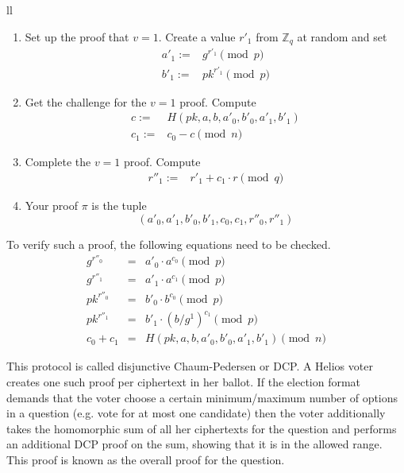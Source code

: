 \documentclass{llncs}
\begin{document}
\begin{center}
\begin{tabular}{ll}
\begin{minipage}{0.45\textwidth}
\begin{enumerate}
\item Set up the proof that $v = 1$.
Create a value $r'_1$ from $\mathbb Z_q$ at random and set
\[ \begin{array}{rl}
a'_1 := & g^{r'_1} \pmod{p} \\
b'_1 := & pk^{r'_1} \pmod{p}
\end{array} \]

\item Get the challenge for the $v = 1$ proof.
Compute
\[ \begin{array}{rl}
c := & H(pk, a, b, a'_0, b'_0, a'_1, b'_1) \\
c_1 := & c_0 - c \pmod{n}
\end{array} \]

\item Complete the $v = 1$ proof.
Compute
\[ \begin{array}{rl}
r''_1 := & r'_1 + c_1 \cdot r \pmod{q}
\end{array} \]

\item Your proof $\pi$ is the tuple
\[
(a'_0, a'_1, b'_0, b'_1, c_0, c_1, r''_0, r''_1)
\]
\end{enumerate}
\end{minipage}
\end{tabular}
\end{center}

To verify such a proof, the following equations need to be checked.
\begin{eqnarray}
g^{r''_0} & = & a'_0 \cdot a^{c_0} \pmod{p} \\
g^{r''_1} & = & a'_1 \cdot a^{c_1} \pmod{p} \\
pk^{r''_0} & = & b'_0 \cdot b^{c_0} \pmod{p} \\
pk^{r''_1} & = & b'_1 \cdot (b/g^1)^{c_1} \pmod{p} \\
c_0 + c_1 & = & H(pk, a, b, a'_0, b'_0, a'_1, b'_1) \pmod{n}
\end{eqnarray}

This protocol is called disjunctive Chaum-Pedersen or DCP. A Helios voter
creates one such proof per ciphertext in her ballot. If the election format
demands that the voter choose a certain minimum/maximum number of options in a
question (e.g. vote for at most one candidate) then the voter additionally takes
the homomorphic sum of all her ciphertexts for the question and performs an
additional DCP proof on the sum, showing that it is in the allowed range. This
proof is known as the overall proof for the question.
\end{document}
